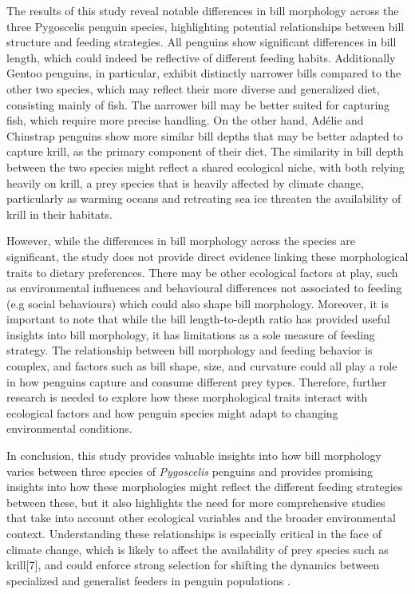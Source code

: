 \documentclass[
]{article}
\begin{document}
The results of this study reveal notable differences in bill morphology
across the three Pygoscelis penguin species, highlighting potential
relationships between bill structure and feeding strategies. All
penguins show significant differences in bill length, which could indeed
be reflective of different feeding habits. Additionally Gentoo penguins,
in particular, exhibit distinctly narrower bills compared to the other
two species, which may reflect their more diverse and generalized diet,
consisting mainly of fish. The narrower bill may be better suited for
capturing fish, which require more precise handling. On the other hand,
Adélie and Chinstrap penguins show more similar bill depths that may be
better adapted to capture krill, as the primary component of their diet.
The similarity in bill depth between the two species might reflect a
shared ecological niche, with both relying heavily on krill, a prey
species that is heavily affected by climate change, particularly as
warming oceans and retreating sea ice threaten the availability of krill
in their habitats.

However, while the differences in bill morphology across the species are
significant, the study does not provide direct evidence linking these
morphological traits to dietary preferences. There may be other
ecological factors at play, such as environmental influences and
behavioural differences not associated to feeding (e.g social
behaviours) which could also shape bill morphology. Moreover, it is
important to note that while the bill length-to-depth ratio has provided
useful insights into bill morphology, it has limitations as a sole
measure of feeding strategy. The relationship between bill morphology
and feeding behavior is complex, and factors such as bill shape, size,
and curvature could all play a role in how penguins capture and consume
different prey types. Therefore, further research is needed to explore
how these morphological traits interact with ecological factors and how
penguin species might adapt to changing environmental conditions.

In conclusion, this study provides valuable insights into how bill
morphology varies between three species of \emph{Pygoscelis} penguins
and provides promising insights into how these morphologies might
reflect the different feeding strategies between these, but it also
highlights the need for more comprehensive studies that take into
account other ecological variables and the broader environmental
context. Understanding these relationships is especially critical in the
face of climate change, which is likely to affect the availability of
prey species such as krill{[}7{]}, and could enforce strong selection
for shifting the dynamics between specialized and generalist feeders in
penguin populations .
\end{document}
